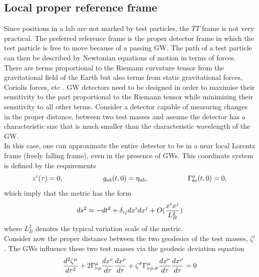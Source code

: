 \documentclass[binding=0.6cm, LaM]{sapthesis}
\begin{document}
\subsection{Local proper reference frame}

        Since positions in a lab are not marked by test particles,
        the $TT$ frame is not very practical.
        The preferred reference frame is the proper detector frame
        in which the test particle is free to move because of a passing GW.
        The path of a test particle can then be described by Newtonian equations of motion in terms of forces.
        There are terms proportional to the Riemann curvature tensor from the gravitational field of the Earth
        but also terms from static gravitational forces, Coriolis forces, etc \cite{5}.
	GW detectors need to be designed in order to maximise their sensitivity to the part proportional to the Riemann tensor while minimizing their sensitivity to all other terms.
        Consider a detector capable of measuring changes in the proper distance, between two test masses
        and assume the detector has a characteristic size that is much smaller
        than the characteristic wavelength of the GW. \\
        In this case, one can approximate the entire detector to be in a near local Lorentz frame
        (freely falling frame), even in the presence of GWs. This coordinate system is defined by the requirements
                \begin{equation}
                	z^i(\tau) = 0, \hspace*{2cm} g_{ab}(t, 0) = \eta_{ab}, \hspace*{2cm} \Gamma^a_{bc}(t,0) = 0,
                \end{equation}
        which imply that the metric has the form
                \begin{equation}
                	ds^2 \approx -dt^2 + \delta_{ij}dx^i dx^j + O({{x^ix^j}\over{L^2_B}})
                \end{equation}
        where $L^2_B$ denotes the typical variation scale of the metric. \\
        Consider now the proper distance between the two geodesics of the test masses, $\zeta^i$.
        The GWs influence these two test masses via the geodesic deviation equation
                \begin{equation}
                	{{d^2\zeta^{\mu}}\over{d\tau^2}} + 2\Gamma^{\mu}_{\nu\rho}{{dx^{\nu}}\over{d\tau}}{{dx^\rho}\over{d\tau}} + \zeta^{\sigma}\Gamma^{\mu}_{\nu\rho,\sigma}{{dx^{\nu}}\over{d\tau}}{{dx^{\rho}}\over{d\tau}} = 0
                \end{equation}
\end{document}
